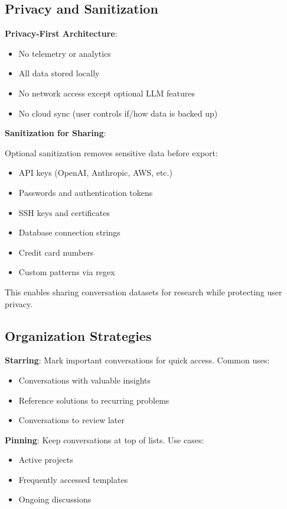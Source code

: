 \documentclass[11pt,letterpaper]{article}
\begin{document}
\subsection{Privacy and Sanitization}

\textbf{Privacy-First Architecture}:

\begin{itemize}
    \item No telemetry or analytics
    \item All data stored locally
    \item No network access except optional LLM features
    \item No cloud sync (user controls if/how data is backed up)
\end{itemize}

\textbf{Sanitization for Sharing}:

Optional sanitization removes sensitive data before export:
\begin{itemize}
    \item API keys (OpenAI, Anthropic, AWS, etc.)
    \item Passwords and authentication tokens
    \item SSH keys and certificates
    \item Database connection strings
    \item Credit card numbers
    \item Custom patterns via regex
\end{itemize}

This enables sharing conversation datasets for research while protecting user privacy.

\subsection{Organization Strategies}

\textbf{Starring}: Mark important conversations for quick access. Common uses:
\begin{itemize}
    \item Conversations with valuable insights
    \item Reference solutions to recurring problems
    \item Conversations to review later
\end{itemize}

\textbf{Pinning}: Keep conversations at top of lists. Use cases:
\begin{itemize}
    \item Active projects
    \item Frequently accessed templates
    \item Ongoing discussions
\end{itemize}
\end{document}
